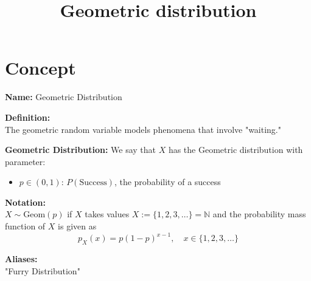 \documentclass{article}
\title{Geometric distribution}
\begin{document}
\maketitle

\section{Concept}

\textbf{Name:} Geometric Distribution

\textbf{Definition:} \\
The geometric random variable models phenomena that involve "waiting."

\textbf{Geometric Distribution:} We say that \( X \) has the Geometric distribution with parameter:
\begin{itemize}
    \item \( p \in (0, 1) \): \( P(\text{Success}) \), the probability of a success
\end{itemize}

\textbf{Notation:} \\
\( X \sim \text{Geom}(p) \) if \( X \) takes values \( X := \{1, 2, 3, \ldots\} = \mathbb{N} \)  
and the probability mass function of \( X \) is given as
\[
p_X(x) = p (1 - p)^{x - 1}, \quad x \in \{1, 2, 3, \ldots\}
\]

\textbf{Aliases:} \\
"Furry Distribution"
\end{document}
